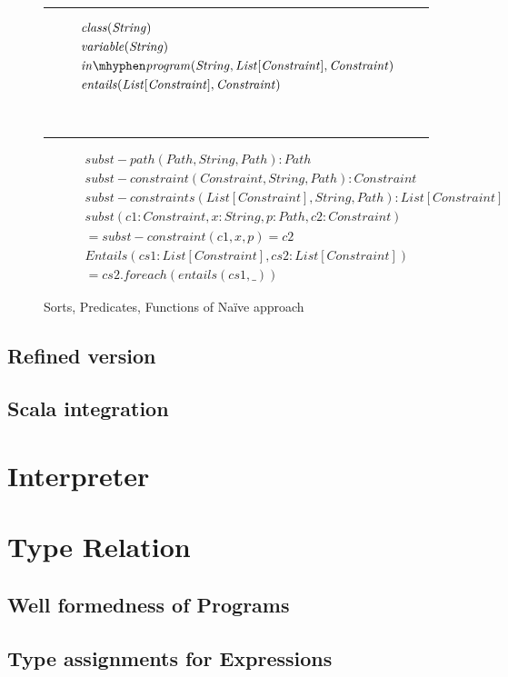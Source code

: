 \begin{figure}[t]
\begin{subfigure}[c]{1\textwidth}
\label{subfig:axioms-naive-general-sorts}
\end{subfigure}\\
\hrule
\begin{subfigure}[c]{1\textwidth}
\centering
\begin{align*}
&\mathit{class}(\mathit{String}) \\
&\mathit{variable}(\mathit{String})\\
&\inprog(\mathit{String},\mathit{List[Constraint]}, \mathit{Constraint}) \\
&\mathit{entails}(\mathit{List[Constraint]}, \mathit{Constraint})
\end{align*}
\label{subfig:axioms-naive-general-predicates}
\end{subfigure}\\
\hrule
\begin{subfigure}[c]{1\textwidth}
\centering
\begin{align*}
\mathit{subst-path(Path, String, Path): Path} \\
\mathit{subst-constraint(Constraint, String, Path): Constraint} \\
\mathit{subst-constraints(List[Constraint], String, Path): List[Constraint]} \\
\mathit{subst(c1: Constraint, x: String, p: Path, c2: Constraint)} \\
= \mathit{subst-constraint(c1, x, p) = c2} \\
\mathit{Entails(cs1: List[Constraint], cs2: List[Constraint])} \\
= \mathit{cs2.foreach(entails(cs1, \_))}
\end{align*}
\label{subfig:axioms-naive-general-funs}
\end{subfigure}
\caption{Sorts, Predicates, Functions of Na\"ive approach}
\label{fig:axioms-naive-general}
\end{figure}

\subsection{Refined version}
\subsection{Scala integration}

\section{Interpreter}
\section{Type Relation}
\subsection{Well formedness of Programs}
\subsection{Type assignments for Expressions}

